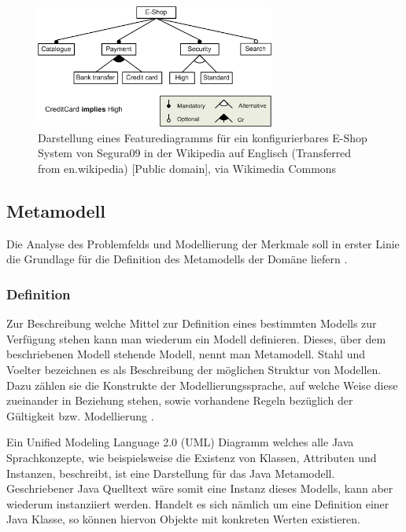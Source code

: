\documentclass[12pt,oneside,a4paper,parskip]{scrbook}
\begin{document}
\begin{figure}[tbp]
\centering
\includegraphics[width=0.7\textwidth]{bilder/E-shopFM.jpg}
\caption{Darstellung eines Featurediagramms für ein konfigurierbares E-Shop System von Segura09 in der Wikipedia auf Englisch (Transferred from en.wikipedia) [Public domain], via Wikimedia Commons}
\label{fig:fd}
\end{figure}

\subsection{Metamodell}

Die Analyse des Problemfelds und Modellierung der Merkmale soll in erster Linie die Grundlage für die Definition des Metamodells der Domäne liefern \cite[S. 200]{stahl2007}. 

\subsubsection{Definition}

Zur Beschreibung welche Mittel zur Definition eines bestimmten Modells zur Verfügung stehen kann man wiederum ein Modell definieren. Dieses, über dem beschriebenen Modell stehende Modell, nennt man Metamodell. Stahl und Voelter bezeichnen es als Beschreibung der möglichen Struktur von Modellen. Dazu zählen sie die Konstrukte der Modellierungssprache, auf welche Weise diese zueinander in Beziehung stehen, sowie vorhandene Regeln bezüglich der Gültigkeit bzw. Modellierung \cite[S. 59]{stahl2007}.

Ein Unified Modeling Language 2.0 (UML) Diagramm welches alle Java Sprachkonzepte, wie beispielsweise die Existenz von Klassen, Attributen und Instanzen, beschreibt, ist eine Darstellung für das Java Metamodell. Geschriebener Java Quelltext wäre somit eine Instanz dieses Modells, kann aber wiederum instanziiert werden. Handelt es sich nämlich um eine Definition einer Java Klasse, so können hiervon Objekte mit konkreten Werten existieren.
\end{document}
